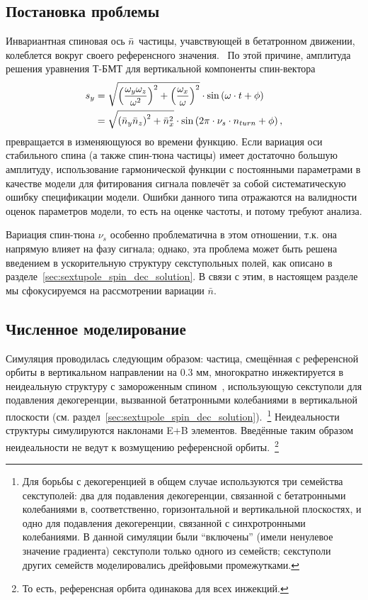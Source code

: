 
\subsection{Постановка проблемы}
Инвариантная спиновая ось $\bar n$ частицы, учавствующей в бетатронном движении, 
колеблется вокруг своего референсного значения.~\cite[стр.~11]{Shatunov} 
По этой причине, амплитуда решения уравнения Т-БМТ для вертикальной компоненты спин-вектора
\begin{align}
s_y &= \sqrt{\bkt{\frac{\w_y\w_z}{\w^2}}^2 + \bkt{\frac{\w_x}{\w}}^2}\cdot\sin\bkt{\w\cdot t + \phi}\notag\\
&= \sqrt{\bkt{\bar n_y\bar n_z}^2 + \bar n_x^2} \cdot \sin\bkt{2\pi\cdot\nu_s\cdot n_{turn} + \phi},\label{eq:sy_varying_amplitude}
\end{align}
превращается в изменяющуюся во времени функцию. Если вариация оси стабильного спина (а также спин-тюна частицы) имеет достаточно большую амплитуду, использование гармонической функции с постоянными параметрами в качестве модели для фитирования сигнала повлечёт за собой систематическую ошибку спецификации модели. Ошибки данного типа отражаются на валидности оценок параметров модели, то есть на оценке частоты, и потому требуют анализа.

Вариация спин-тюна $\nu_s$ особенно проблематична в этом отношении, т.к. она напрямую влияет на фазу сигнала; однако, эта проблема может быть решена введением в ускорительную структуру секступольных полей, как описано в разделе~\ref{sec:sextupole_spin_dec_solution}. В связи с этим, в настоящем разделе мы сфокусируемся на рассмотрении вариации $\bar n$.

\subsection{Численное моделирование}
Симуляция проводилась следующим образом: частица, смещённая с референсной орбиты в вертикальном направлении
на 0.3 мм, многократно инжектируется в неидеальную структуру с замороженным спином~\cite{Senichev:Lattices},
использующую секступоли для подавления декогеренции, вызванной бетатронными колебаниями
в вертикальной плоскости (см. раздел~\ref{sec:sextupole_spin_dec_solution}).~\footnote{Для борьбы с декогеренцией
в общем случае используются три семейства секступолей: два для подавления декогеренции, 
связанной с бетатронными колебаниями в, соответственно, горизонтальной и вертикальной плоскостях, и одно 
для подавления декогеренции, связанной с синхротронными колебаниями. В данной симуляции были ``включены'' 
(имели ненулевое значение градиента) секступоли только одного из семейств; секступоли других семейств
моделировались дрейфовыми промежутками.}
Неидеальности структуры симулируются наклонами E+B элементов.
Введённые таким образом неидеальности не ведут к возмущению референсной орбиты.~\footnote{То есть,
референсная орбита 
одинакова для всех инжекций.}

